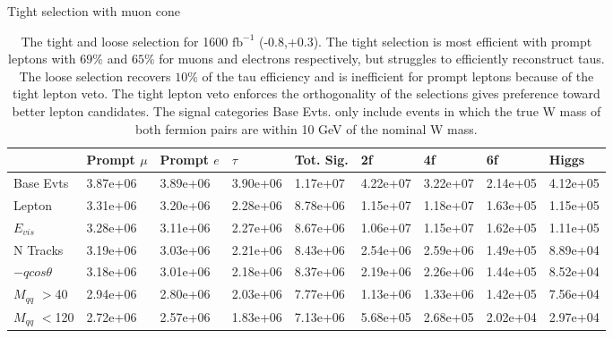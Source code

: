 \begin{table}

\caption{The tight and loose selection for 1600 $\text{fb}^{-1}$ (-0.8,+0.3). The tight selection is most efficient with prompt leptons with $69\%$ and $65\%$  for muons and electrons respectively, but struggles to efficiently reconstruct taus. The loose selection recovers $10\%$ of the tau efficiency and is inefficient for prompt leptons because of the tight lepton veto. The tight lepton veto enforces the orthogonality of the selections gives preference toward better lepton candidates. The signal categories Base Evts. only include events in which the true W mass of both fermion pairs are within 10 GeV of the nominal W mass.}
\label{tab:selection}
 \scriptsize
 Tight selection with muon cone
   \begin{tabular}{|p{}|p{}p{}p{}p{}p{}p{}p{}p{}|}
\hline 
   & Prompt $\mu$ & Prompt $e$ & $\tau$ & Tot. Sig. & 2f & 4f & 6f & Higgs \\ \hline 
Base Evts & {3.87e+06 } &  {3.89e+06 } &  {3.90e+06} & {1.17e+07} &  {4.22e+07} &  {3.22e+07} &  {2.14e+05} &  {4.12e+05} \\ 

Lepton & {3.31e+06 } &  {3.20e+06 } &  {2.28e+06} & {8.78e+06} &  {1.15e+07} &  {1.18e+07} &  {1.63e+05} &  {1.15e+05} \\ 
 
$E_{vis}$ & {3.28e+06 } &  {3.11e+06 } &  {2.27e+06} & {8.67e+06} &  {1.06e+07} &  {1.15e+07} &  {1.62e+05} &  {1.11e+05} \\ 
 
N Tracks & {3.19e+06 } &  {3.03e+06 } &  {2.21e+06} & {8.43e+06} &  {2.54e+06} &  {2.59e+06} &  {1.49e+05} &  {8.89e+04} \\ 
 
$-qcos\theta$ & {3.18e+06 } &  {3.01e+06 } &  {2.18e+06} & {8.37e+06} &  {2.19e+06} &  {2.26e+06} &  {1.44e+05} &  {8.52e+04} \\ 
 
$M_{qq}$ $>$40 & {2.94e+06 } &  {2.80e+06 } &  {2.03e+06} & {7.77e+06} &  {1.13e+06} &  {1.33e+06} &  {1.42e+05} &  {7.56e+04} \\ 
 
$M_{qq}$ $<$120 & {2.72e+06 } &  {2.57e+06 } &  {1.83e+06} & {7.13e+06} &  {5.68e+05} &  {2.68e+05} &  {2.02e+04} &  {2.97e+04} \\ 
 

\end{tabular}
\end{table}
